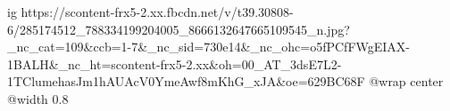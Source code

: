  
 
 
 
 

\ifcmt
  ig https://scontent-frx5-2.xx.fbcdn.net/v/t39.30808-6/285174512_788334199204005_8666132647665109545_n.jpg?_nc_cat=109&ccb=1-7&_nc_sid=730e14&_nc_ohc=o5fPCfFWgEIAX-1BALH&_nc_ht=scontent-frx5-2.xx&oh=00_AT_3dsE7L2-1TClumehasJm1hAUAcV0YmeAwf8mKhG_xJA&oe=629BC68F
  @wrap center
  @width 0.8
\fi

